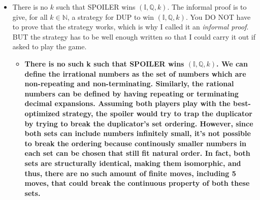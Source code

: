 \documentclass[12pt]{article}
\newcommand{\I}{\mathbb{I}}
\newcommand{\N}{\mathbb{N}}
\newcommand{\Q}{\mathbb{Q}}
\begin{document}
\begin{enumerate}
\begin{enumerate}
\begin{itemize}
\item
There is no $k$ such that SPOILER wins $(\I,\Q,k)$. 
The informal proof is to give, for all $k\in\N$, a strategy
for DUP to win $(\I,\Q,k)$. 
You DO NOT have to prove that
the strategy works, which is why I called it an {\it informal proof}.
BUT the strategy has to be well enough written so that I could carry
it out if asked to play the game.
\begin{itemize}
    \item \textbf{There is no such k such that SPOILER wins $(\I, \Q, k)$. We can define the irrational numbers as the set of numbers which are non-repeating and non-terminating. Similarly, the rational numbers can be defined by having repeating or terminating decimal expansions. Assuming both players play with the best-optimized strategy, the spoiler would try to trap the duplicator by trying to break the duplicator's set ordering. However, since both sets can include numbers infinitely small, it's not possible to break the ordering because continously smaller numbers in each set can be chosen that still fit natural order. In fact, both sets are structurally identical, making them isomorphic, and thus, there are no such amount of finite moves, including 5 moves, that could break the continuous property of both these sets.}
\end{itemize}
\end{itemize}


\end{enumerate}
\end{enumerate}
\end{document}
